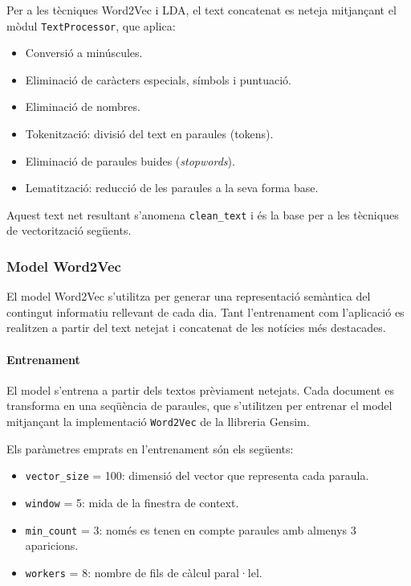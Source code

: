 \documentclass[12pt,a4paper,twoside]{book}
\begin{document}
Per a les tècniques Word2Vec i LDA, el text concatenat es neteja mitjançant el mòdul \texttt{TextProcessor}, que aplica:

\begin{itemize}
    \item Conversió a minúscules.
    \item Eliminació de caràcters especials, símbols i puntuació.
    \item Eliminació de nombres.
    \item Tokenització: divisió del text en paraules (tokens).
    \item Eliminació de paraules buides (\textit{stopwords}).
    \item Lematització: reducció de les paraules a la seva forma base.
\end{itemize}

Aquest text net resultant s'anomena \texttt{clean\_text} i és la base per a les tècniques de vectorització següents.

\subsubsection{Model Word2Vec}

El model Word2Vec s'utilitza per generar una representació semàntica del contingut informatiu rellevant de cada dia. Tant l'entrenament com l'aplicació es realitzen a partir del text netejat i concatenat de les notícies més destacades.

\paragraph{Entrenament}

El model s'entrena a partir dels textos prèviament netejats. Cada document es transforma en una seqüència de paraules, que s'utilitzen per entrenar el model mitjançant la implementació \texttt{Word2Vec} de la llibreria Gensim.

Els paràmetres emprats en l'entrenament són els següents:
\begin{itemize}
    \item \texttt{vector\_size} = 100: dimensió del vector que representa cada paraula.
    \item \texttt{window} = 5: mida de la finestra de context.
    \item \texttt{min\_count} = 3: només es tenen en compte paraules amb almenys 3 aparicions.
    \item \texttt{workers} = 8: nombre de fils de càlcul paral·lel.
\end{itemize}
\end{document}
